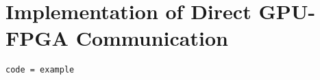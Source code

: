 \chapter{Implementation of Direct GPU-FPGA Communication}
\label{section:implementation}

\begin{lstlisting}[label=listing:example_code, caption=example]
code = example
\end{lstlisting}
